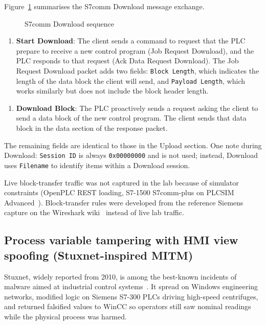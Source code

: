 ﻿\documentclass[../main.tex]{subfiles}
\begin{document}
Figure~\ref{fig:s7-download-sequence} summarises the S7comm Download message exchange.

\begin{figure}[htbp]
    \centering
    \SSevenDownloadSequence
    \caption{S7comm Download sequence}
    \label{fig:s7-download-sequence}
\end{figure}


\begin{enumerate}
    \item \textbf{Start Download}: The client sends a command to request that the PLC prepare to receive a new control program (Job Request Download), and the PLC responds to that request (Ack Data Request Download). The Job Request Download packet adds two fields: \texttt{Block Length}, which indicates the length of the data block the client will send, and \texttt{Payload Length}, which works similarly but does not include the block header length.
\end{enumerate}



\begin{enumerate}
    \item \textbf{Download Block}: The PLC proactively sends a request asking the client to send a data block of the new control program. The client sends that data block in the data section of the response packet.
\end{enumerate}


The remaining fields are identical to those in the Upload section. One note during Download: \texttt{Session ID} is always \texttt{0x00000000} and is not used; instead, Download uses \texttt{Filename} to identify items within a Download session.

Live block-transfer traffic was not captured in the lab because of simulator constraints (OpenPLC REST loading, S7-1500 S7comm-plus on PLCSIM Advanced~\cite{industrialmonitordirect_s7comm_plus}). Block-transfer rules were developed from the reference Siemens capture on the Wireshark wiki~\cite{wireshark_s7comm} instead of live lab traffic.

\subsection{Process variable tampering with HMI view spoofing (Stuxnet-inspired MITM)}
\label{sec:stuxnet_mitm_sim}

Stuxnet, widely reported from 2010, is among the best-known incidents of malware aimed at industrial control systems~\cite{falliere2010stuxnet,langner2011stuxnet,stuxnet_work_details}. It spread on Windows engineering networks, modified logic on Siemens S7-300 PLCs driving high-speed centrifuges, and returned falsified values to WinCC so operators still saw nominal readings while the physical process was harmed.
\end{document}
